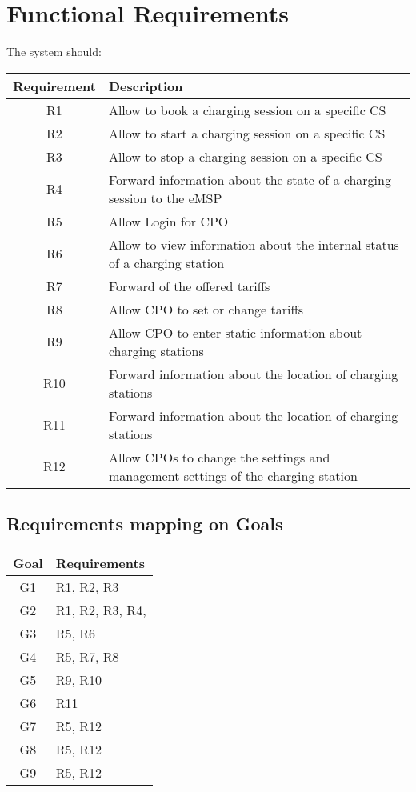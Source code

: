 \clearpage
\newpage


\section{Functional Requirements}

The system should:\\

\begin{tabular}{|c|l|}
	\hline
	\bf{Requirement} & \bf{Description} \\
	\hline
	R1 & Allow to book a charging session on a specific CS\\
	\hline
	R2 & Allow to start a charging session on a specific CS\\
	\hline
	R3 & Allow to stop a charging session on a specific CS\\
	\hline
	R4 & Forward information about the state of a charging session to the eMSP\\
	\hline
	R5 & Allow Login for CPO\\
	\hline
	R6 & Allow to view information about the internal status of a charging station\\
	\hline
	R7 & Forward of the offered tariffs\\
	\hline
	R8 & Allow CPO to set or change tariffs\\
	\hline
	R9 & Allow CPO to enter static information about charging stations\\
	\hline
	R10 & Forward information about the location of charging stations\\
	\hline
	R11 & Forward information about the location of charging stations\\
	\hline
	R12 & Allow CPOs to change the settings and management settings of the charging station\\
	\hline
\end{tabular}

\subsection{Requirements mapping on Goals}
\begin{tabular}{|c|l|}
	\hline
	\bf{Goal} & \bf{Requirements}\\
	\hline
	G1 & R1, R2, R3\\
	G2 & R1, R2, R3, R4,\\
	G3 & R5, R6\\
	G4 & R5, R7, R8\\
	G5 & R9, R10\\
	G6 & R11\\
	G7 & R5, R12\\
	G8 & R5, R12\\
	G9 & R5, R12\\
	\hline
\end{tabular}

